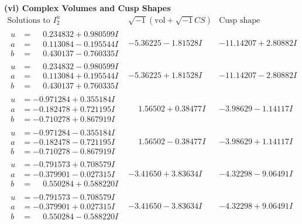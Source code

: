 \documentclass[1p]{elsarticle_modified}
\theoremstyle{definition}
\newcommand{\I}{\sqrt{-1}}
\begin{document}
\newpage\flushleft \textbf{(vi) Complex Volumes and Cusp Shapes}
$$\begin{array}{c|c|c}  
\text{Solutions to }I^u_{2}& \I (\text{vol} + \sqrt{-1}CS) & \text{Cusp shape}\\
 \hline 
\begin{aligned}
u &= \phantom{-}0.234832 + 0.980599 I \\
a &= \phantom{-}0.113084 - 0.195544 I \\
b &= \phantom{-}0.430137 - 0.760335 I\end{aligned}
 & -5.36225 - 1.81528 I & -11.14207 + 2.80882 I \\ \hline\begin{aligned}
u &= \phantom{-}0.234832 - 0.980599 I \\
a &= \phantom{-}0.113084 + 0.195544 I \\
b &= \phantom{-}0.430137 + 0.760335 I\end{aligned}
 & -5.36225 + 1.81528 I & -11.14207 - 2.80882 I \\ \hline\begin{aligned}
u &= -0.971284 + 0.355184 I \\
a &= -0.182478 + 0.721195 I \\
b &= -0.710278 + 0.867919 I\end{aligned}
 & \phantom{-}1.56502 + 0.38477 I & -3.98629 - 1.14117 I \\ \hline\begin{aligned}
u &= -0.971284 - 0.355184 I \\
a &= -0.182478 - 0.721195 I \\
b &= -0.710278 - 0.867919 I\end{aligned}
 & \phantom{-}1.56502 - 0.38477 I & -3.98629 + 1.14117 I \\ \hline\begin{aligned}
u &= -0.791573 + 0.708579 I \\
a &= -0.379901 - 0.027315 I \\
b &= \phantom{-}0.550284 + 0.588220 I\end{aligned}
 & -3.41650 + 3.83634 I & -4.32298 - 9.06491 I \\ \hline\begin{aligned}
u &= -0.791573 - 0.708579 I \\
a &= -0.379901 + 0.027315 I \\
b &= \phantom{-}0.550284 - 0.588220 I\end{aligned}
 & -3.41650 - 3.83634 I & -4.32298 + 9.06491 I \\ \hline\begin{aligned}

\end{aligned}
\end{array}$$
\end{document}
